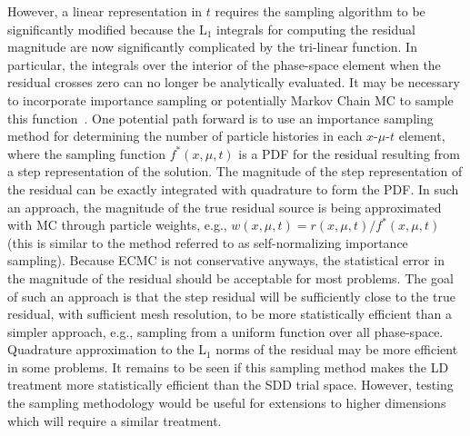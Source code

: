 However, a linear representation in $t$ requires the sampling
algorithm to be significantly modified because the L$_1$ integrals for computing the
residual magnitude are now significantly complicated by the tri-linear function.  In
particular, the integrals over the interior of the phase-space element when the residual
crosses zero can no longer be analytically evaluated.   It may be 
necessary to incorporate importance sampling or potentially Markov Chain MC to sample this
function~\cite{shultis_mc}.  One potential path forward is to use an importance sampling
method for determining the number of particle histories in each $x$-$\mu$-$t$ element,
where the sampling function $f^*(x,\mu,t)$ is a PDF for the residual resulting from a step
representation of the solution.  The magnitude of the step representation of the residual
can be exactly integrated with quadrature to form the PDF.  In such an approach, the
magnitude of the true residual source is being
approximated with MC through particle weights, e.g., $w(x,\mu,t)=r(x,\mu,t)/f^*(x,\mu,t)$
(this is similar to the method referred to as self-normalizing importance sampling). Because ECMC is not
conservative anyways, the statistical error in the magnitude of the residual should be
acceptable for most problems.  The goal of such an approach is
that the step residual will be sufficiently close to the true residual, with sufficient
mesh resolution, to be more statistically efficient than a simpler approach, e.g.,
sampling from a uniform function over all phase-space.  Quadrature approximation to the L$_1$ norms of the
residual may be more efficient in some problems. It remains to be seen if this sampling
method makes the LD treatment more statistically efficient than the SDD trial space.
However, testing the sampling methodology would be useful
for extensions to higher dimensions which will require a similar treatment.



